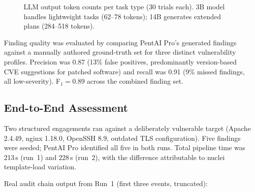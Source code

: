 \documentclass[conference]{IEEEtran}
\begin{document}
\begin{figure}[t]
\centering
{}
\caption{LLM output token counts per task type (30 trials each).
  3B model handles lightweight tasks (62--78 tokens);
  14B generates extended plans (284--518 tokens).}
\label{fig:tokens}
\end{figure}

Finding quality was evaluated by comparing PentAI Pro's generated
findings against a manually authored ground-truth set for three
distinct vulnerability profiles.
Precision was 0.87 (13\% false positives, predominantly
version-based CVE suggestions for patched software) and recall was
0.91 (9\% missed findings, all low-severity).
F$_1 = 0.89$ across the combined finding set.

\subsection{End-to-End Assessment}

Two structured engagements ran against a deliberately vulnerable target
(Apache 2.4.49, nginx 1.18.0, OpenSSH 8.9, outdated TLS configuration).
Five findings were seeded; PentAI Pro identified all five in both runs.
Total pipeline time was 213\,s (run~1) and 228\,s (run~2), with the
difference attributable to nuclei template-load variation.

Real audit chain output from Run~1 (first three events, truncated):
\end{document}
